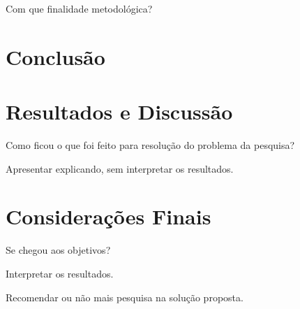 \documentclass[
	article,			%
	11pt,				%
	oneside,			%
	a4paper,			%
	chapter=TITLE,		%
	section=TITLE,		%
	subsection=TITLE,	%
	subsubsection=TITLE, %
	english,			%
	brazil,				%
	sumario=tradicional
	]{ifrs-farr-artigo-abntex2}
\begin{document}
Com que finalidade metodológica?

\section{Conclusão}
\section{Resultados e Discussão}
Como ficou o que foi feito para resolução do problema da pesquisa?

Apresentar explicando, sem interpretar os resultados.

% 

\section{Considerações Finais}
Se chegou aos objetivos?

Interpretar os resultados.

Recomendar ou não mais pesquisa na solução proposta.

\newpage
\postextual


%
%

\end{document}
